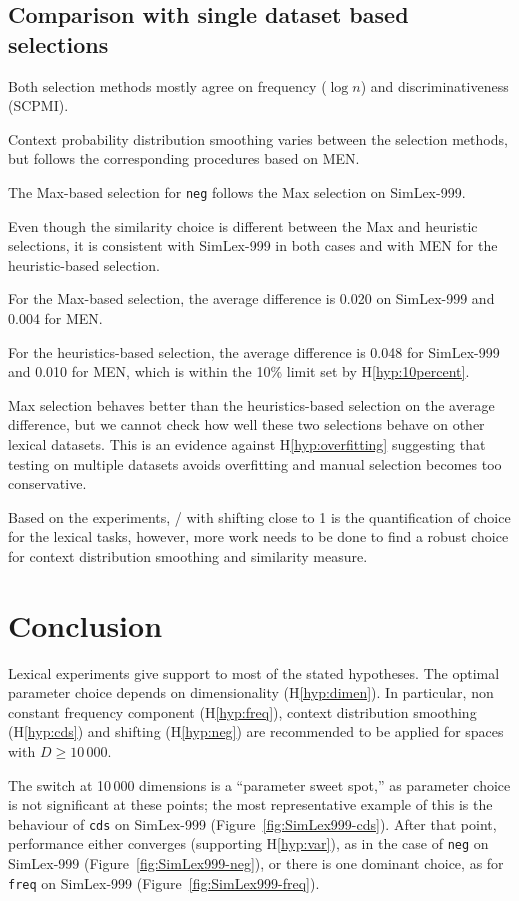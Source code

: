 \subsection{Comparison with single dataset based selections}

Both selection methods mostly agree on frequency ($\log n$) and discriminativeness (SCPMI).

Context probability distribution smoothing varies between the selection methods, but follows the corresponding procedures based on MEN.

The Max-based selection for \texttt{neg} follows the Max selection on SimLex-999.

Even though the similarity choice is different between the Max and heuristic selections, it is consistent with SimLex-999 in both cases and with MEN for the heuristic-based selection.

For the Max-based selection, the average difference is 0.020 on SimLex-999 and 0.004 for MEN.

For the heuristics-based selection, the average difference is 0.048 for SimLex-999 and 0.010 for MEN, which is within the 10\% limit set by H\ref{hyp:10percent}.

Max selection behaves better than the heuristics-based selection on the average difference, but we cannot check how well these two selections behave on other lexical datasets. This is an evidence against H\ref{hyp:overfitting} suggesting that testing on multiple datasets avoids overfitting and manual selection becomes too conservative.

Based on the experiments, \logNSCPMI/ with shifting close to 1 is the quantification of choice for the lexical tasks, however, more work needs to be done to find a robust choice for context distribution smoothing and similarity measure.

\section{Conclusion}
\label{sec:conclusion-lexical}

Lexical experiments give support to most of the stated hypotheses. The optimal parameter choice depends on dimensionality (H\ref{hyp:dimen}). In particular, non constant frequency component (H\ref{hyp:freq}), context distribution smoothing (H\ref{hyp:cds}) and shifting (H\ref{hyp:neg}) are recommended to be applied for spaces with $D \geq 10\,000$.

The switch at 10\,000 dimensions is a ``parameter sweet spot,'' as parameter choice is not significant at these points; the most representative example of this is the behaviour of \texttt{cds} on SimLex-999 (Figure~\ref{fig:SimLex999-cds}). After that point, performance either converges (supporting H\ref{hyp:var}), as in the case of \texttt{neg} on SimLex-999 (Figure~\ref{fig:SimLex999-neg}), or there is one dominant choice, as for \texttt{freq} on SimLex-999 (Figure~\ref{fig:SimLex999-freq}).

